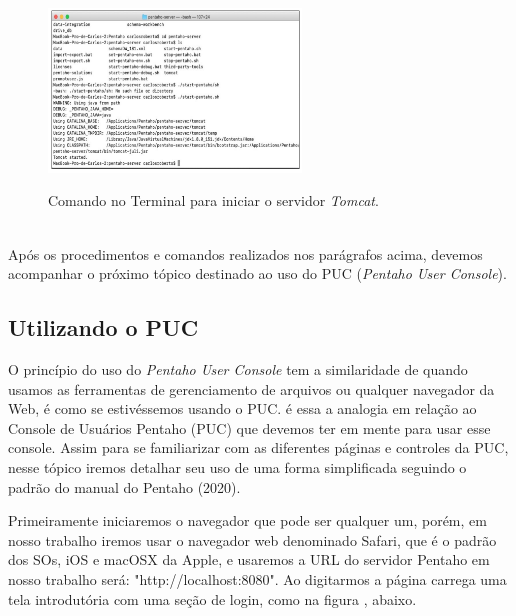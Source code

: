 \begin{figure}[H]
	\vspace*{0,2cm}
    \centering
    \caption{Comando no Terminal para iniciar o servidor \textit{Tomcat}.}
    \includegraphics[width=0.6\textwidth]{./04-figuras/figura-pserver-iniciando}
    \label{fig:ilustfigpserveriniciando}
\end{figure}
\vspace*{-0,9cm}
{\raggedright {}} \\

Ap\'os os procedimentos e comandos realizados nos par\'{a}grafos acima, devemos acompanhar o pr\'oximo t\'opico destinado ao uso do PUC (\textit{Pentaho User Console}).


\subsection{Utilizando o PUC}

O princípio do uso do \textit{Pentaho User Console} tem a similaridade de quando usamos as ferramentas de gerenciamento de arquivos ou qualquer navegador da Web, \'{e} como se estiv\'{e}ssemos usando o PUC. \'{e} essa a analogia em rela\c{c}\~{a}o ao Console de Usu\'{a}rios Pentaho (PUC) que devemos ter em mente para usar esse console. Assim para se familiarizar com as diferentes p\'{a}ginas e controles da PUC, nesse t\'opico iremos detalhar seu uso de uma forma simplificada seguindo o padr\~{a}o do manual do Pentaho (2020).

Primeiramente iniciaremos o navegador que pode ser qualquer um, por\'{e}m, em nosso trabalho iremos usar o navegador web denominado Safari, que \'{e} o padr\~{a}o dos SOs, iOS e macOSX da Apple, e usaremos a URL do servidor Pentaho em nosso trabalho ser\'{a}: "http://localhost:8080".  Ao digitarmos a p\'{a}gina carrega uma tela introdut\'oria com uma se\c{c}\~{a}o de login, como na figura , abaixo.

